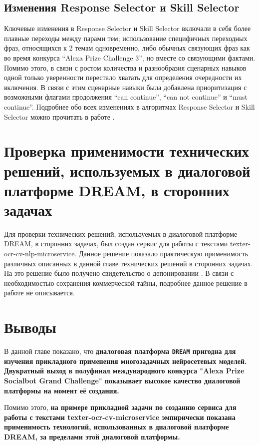 \subsection{Изменения Response Selector и Skill Selector}

Ключевые изменения в Response Selector и Skill Selector включали в себя более плавные переходы между парами тем; использование специфичных переходных фраз, относящихся к 2 темам одновременно, либо обычных связующих фраз как во время конкурса “Alexa Prize Challenge 3”, но вместе со связующими фактами. 
Помимо этого, в связи с ростом количества и разнообразия сценарных навыков одной только уверенности перестало хватать для определения очередности их включения. В связи с этим сценарные навыки была добавлена приоритизация с возможными флагами продолжения “can continue”, “can not continue” и “must continue”.
Подробнее обо всех изменениях в алгоритмах Response Selector и Skill Selector можно прочитать в работе \cite{baymurzina_2021}.

\section{Проверка применимости технических решений, используемых в диалоговой платформе DREAM, в сторонних задачах}

Для проверки технических решений, используемых в диалоговой платформе DREAM, в сторонних задачах, был создан сервис для работы с текстами texter-ocr-cv-nlp-microservice. Данное решение показало практическую применимость различных описанных в данной главе технических решений в сторонних задачах. На это решение было получено свидетельство о депонировании \cite{Дуплякин_Дмитрий_Ондар_Ушаков_2021}. В связи с необходимостью сохранения коммерческой тайны, подробнее данное решение в работе не описывается.

\section{Выводы}

В данной главе показано, что \textbf{диалоговая платформа \texttt{DREAM} пригодна для изучения прикладного применения многозадачных нейросетевых моделей. Двукратный выход в полуфинал международного конкурса "Alexa Prize Socialbot Grand Challenge" показывает высокое качество диалоговой платформы на момент её создания.}

Помимо этого, \textbf{на примере прикладной задачи по созданию сервиса для работы с текстами texter-ocr-cv-microservice эмпирически показана применимость технологий, использованных в диалоговой платформе DREAM, за пределами этой диалоговой платформы.}


